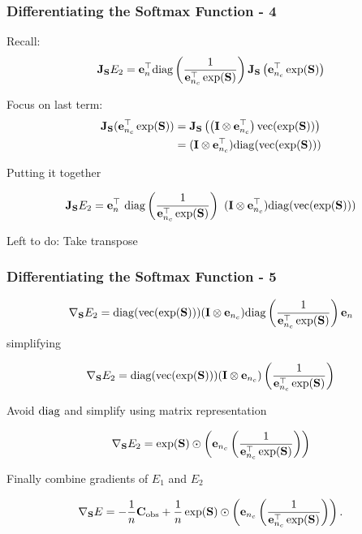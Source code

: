 \documentclass[12pt,fleqn,handout]{beamer}
\begin{document}
\begin{frame}[fragile]\frametitle{Differentiating the Softmax Function - 4}
	Recall:
$$ {\bf J}_{{\bf S}}  E_2 = {\bf e}_n^\top  {\rm diag}
\left( {\frac {1}{{\bf e}_{n_c}^\top\exp({\bf S})}}\right)
{\bf J}_{{\bf S}}\left({\bf e}_{n_c}^\top\exp({\bf S}) \right) $$

Focus on last term:
\begin{align*}
   {\bf J}_{{\bf S}} ({\bf e}_{n_c}^\top \exp({\bf S})) & = {\bf J}_{{\bf S}} \left(\left({\bf I} \otimes {\bf e}_{n_c}^{\top} \right)  {\rm vec}(\exp({\bf S}))\right)\\
   &  = ({\bf I} \otimes {\bf e}_{n_c}^{\top})  {\rm diag}( {\rm vec}(\exp({\bf S})))
\end{align*}
 
 \pause
 Putting it together
 
 
 $$ {\bf J}_{{\bf S}}E_2 =  {\bf e}_n^{\top}\ {\rm diag}
\left( {\frac {1}{{\bf e}_{n_c}^\top \exp({\bf S})}}\right) \  ( {\bf I} \otimes {\bf e}_{n_c}^{\top})  {\rm diag}( {\rm vec}(\exp({\bf S}))) $$


\pause

\begin{center}
	Left to do: Take transpose
\end{center}


\end{frame}

\begin{frame}[fragile]\frametitle{Differentiating the Softmax Function - 5}

 
 $$ \nabla_{{\bf S}}E_2 =     {\rm diag}( {\rm vec}(\exp({\bf S}))) ({\bf I} \otimes {\bf e}_{n_c})
  {\rm diag}
\left( {\frac {1}{{\bf e}_{n_c}^\top\exp({\bf S})}}\right) {\bf e}_n
     $$
\pause
simplifying

 $$ \nabla_{{\bf S}}E_2 =     {\rm diag}( {\rm vec}(\exp({\bf S}))) ({\bf I} \otimes {\bf e}_{n_c})
\left( {\frac {1}{{\bf e}_{n_c}^\top\exp({\bf S})}}\right)
     $$
 
\pause    
     Avoid ${\rm diag}$ and simplify using  matrix representation
     
 $$ \nabla_{{\bf S}}E_2 =     \exp({\bf S}) \odot 
\left( {\bf e}_{n_c} \left({\frac {1}{{\bf e}_{n_c}^\top \exp({\bf S})}}\right)\right) 
     $$
     
     \bigskip
     \pause
     Finally combine gradients of $E_1$ and $E_2$
     
$$     \nabla_{{\bf S}}E =  -\frac{1}{n}{\bf C}_{\rm obs} + \frac{1}{n}\exp({\bf S}) \odot 
\left( {\bf e}_{n_c} \left({\frac {1}{{\bf e}_{n_c}^\top \exp({\bf S})}}\right)\right) . $$
     
    

\end{frame}
\end{document}
